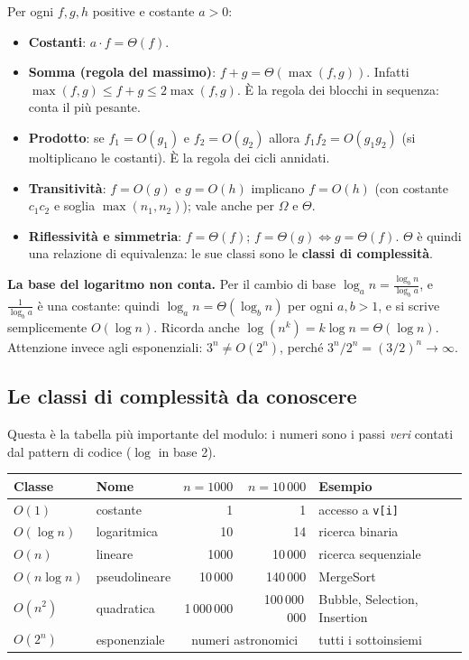 Per ogni $f, g, h$ positive e costante $a > 0$:
\begin{itemize}
  \item \textbf{Costanti}: $a \cdot f = \Theta(f)$.
  \item \textbf{Somma (regola del massimo)}: $f + g = \Theta(\max(f, g))$. Infatti
        $\max(f,g) \le f + g \le 2 \max(f, g)$. È la regola dei blocchi in sequenza:
        conta il più pesante.
  \item \textbf{Prodotto}: se $f_1 = O(g_1)$ e $f_2 = O(g_2)$ allora
        $f_1 f_2 = O(g_1 g_2)$ (si moltiplicano le costanti). È la regola dei cicli
        annidati.
  \item \textbf{Transitività}: $f = O(g)$ e $g = O(h)$ implicano $f = O(h)$ (con
        costante $c_1 c_2$ e soglia $\max(n_1, n_2)$); vale anche per $\Omega$ e
        $\Theta$.
  \item \textbf{Riflessività e simmetria}: $f = \Theta(f)$; $f = \Theta(g) \iff g = \Theta(f)$.
        $\Theta$ è quindi una relazione di equivalenza: le sue classi sono le
        \textbf{classi di complessità}.
\end{itemize}

\textbf{La base del logaritmo non conta.} Per il cambio di base
$\log_a n = \frac{\log_b n}{\log_b a}$, e $\frac{1}{\log_b a}$ è una costante: quindi
$\log_a n = \Theta(\log_b n)$ per ogni $a, b > 1$, e si scrive semplicemente
$O(\log n)$. Ricorda anche $\log(n^k) = k \log n = \Theta(\log n)$. Attenzione invece
agli esponenziali: $3^n \neq O(2^n)$, perché $3^n/2^n = (3/2)^n \to \infty$.

\subsection*{Le classi di complessità da conoscere}

Questa è la tabella più importante del modulo: i numeri sono i passi \emph{veri}
contati dal pattern di codice ($\log$ in base 2).

\begin{center}\small
\begin{tabular}{llrrl}
\toprule
\textbf{Classe} & \textbf{Nome} & $n = 1000$ & $n = 10\,000$ & \textbf{Esempio} \\
\midrule
$O(1)$        & costante     & 1          & 1           & accesso a \texttt{v[i]} \\
$O(\log n)$   & logaritmica  & 10         & 14          & ricerca binaria \\
$O(n)$        & lineare      & 1000       & 10\,000     & ricerca sequenziale \\
$O(n \log n)$ & pseudolineare & 10\,000 & 140\,000  & MergeSort \\
$O(n^2)$      & quadratica   & 1\,000\,000 & 100\,000\,000 & Bubble, Selection, Insertion \\
$O(2^n)$      & esponenziale & \multicolumn{2}{c}{numeri astronomici} & tutti i sottoinsiemi \\
\bottomrule
\end{tabular}
\end{center}

